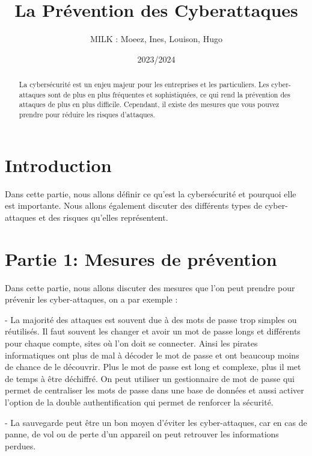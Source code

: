 \documentclass[a4paper,11pt]{article}
\begin{document}
\title{La Prévention des Cyberattaques}
\author{MILK : Moeez, Ines, Louison, Hugo}
\date{2023/2024}
\maketitle

\def\contentsname{Sommaire}
\tableofcontents

\begin{abstract}
  La cybersécurité est un enjeu majeur pour les entreprises et les particuliers. 
  Les cyber-attaques sont de plus en plus fréquentes et sophistiquées, ce qui rend la prévention des attaques de plus en plus difficile. 
  Cependant, il existe des mesures que vous pouvez prendre pour réduire les risques d’attaques.
\end{abstract}


\section{Introduction}

Dans cette partie, nous allons définir ce qu’est la cybersécurité et pourquoi elle est importante. 
Nous allons également discuter des différents types de cyber-attaques et des risques qu’elles représentent.


\section{Partie 1: Mesures de prévention}

Dans cette partie, nous allons discuter des mesures que l’on peut prendre pour prévenir les cyber-attaques, on a par exemple : 

  - La majorité des attaques est souvent due à des mots de passe trop simples ou réutilisés. Il faut souvent les changer et avoir un mot de passe longs et différents pour chaque compte, sites où l’on doit se connecter. Ainsi les pirates informatiques ont plus de mal à décoder le mot de passe et ont beaucoup moins de chance de le découvrir. Plus le mot de passe est long et complexe, plus il met de temps à être déchiffré. On peut utiliser un gestionnaire de mot de passe qui permet de centraliser les mots de passe dans une base de données et aussi activer l’option de la double authentification qui permet de renforcer la sécurité.

  - La sauvegarde peut être un bon moyen d’éviter les cyber-attaques, car en cas de panne, de vol ou de perte d’un appareil on peut retrouver les informations perdues.
\end{document}
